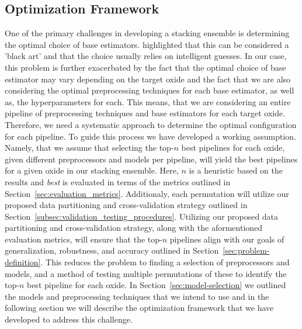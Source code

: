 \subsection{Optimization Framework}\label{sec:optimization_framework}
One of the primary challenges in developing a stacking ensemble is determining the optimal choice of base estimators.
\citet{wolpert1992stacked} highlighted that this can be considered a 'black art' and that the choice usually relies on intelligent guesses.
In our case, this problem is further exacerbated by the fact that the optimal choice of base estimator may vary depending on the target oxide and the fact that we are also considering the optimal preprocessing techniques for each base estimator, as well as, the hyperparameters for each.
This means, that we are considering an entire pipeline of preprocessing techniques and base estimators for each target oxide.
Therefore, we need a systematic approach to determine the optimal configuration for each pipeline.
To guide this process we have developed a working assumption.
Namely, that we assume that selecting the top-$n$ best pipelines for each oxide, given different preprocessors and models per pipeline, will yield the best pipelines for a given oxide in our stacking ensemble.
Here, $n$ is a heuristic based on the results and \textit{best} is evaluated in terms of the metrics outlined in Section~\ref{sec:evaluation_metrics}.
Additionaly, each permutation will utilize our proposed data partitioning and cross-validation strategy outlined in Section~\ref{subsec:validation_testing_procedures}.
Utilizing our proposed data partitioning and cross-validation strategy, along with the aformentioned evaluation metrics, will ensure that the top-$n$ pipelines align with our goals of generalization, robustness, and accuracy outlined in Section~\ref{sec:problem-definition}.
This reduces the problem to finding a selection of preprocessors and models, and a method of testing multiple permutations of these to identify the top-$n$ best pipeline for each oxide.
In Section~\ref{sec:model-selection} we outlined the models and preprocessing techniques that we intend to use and in the following section we will describe the optimization framework that we have developed to address this challenge.


